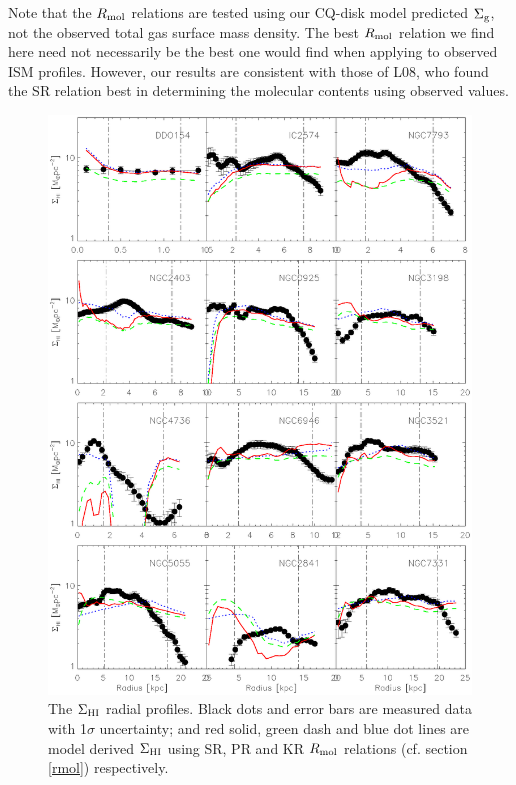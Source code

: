 \documentclass[12pt,preprint]{aastex}
\begin{document}
Note that the $  R_{\rm mol}$ relations are tested using our CQ-disk model predicted $  \Sigma_{\rm g}$, not the observed total gas surface mass density. The best $  R_{\rm mol}$ relation we find here need not necessarily be the best one would find when applying to observed ISM profiles.  However, our results are consistent with those of L08, who found the SR relation best in determining the molecular contents using observed values. 



\begin{figure}
\begin{center}
\includegraphics[scale=0.8]{Sigma_HI.eps}   \caption{The $\Sigma_{\rm HI}$ radial profiles. Black dots and error bars are measured data with 1$\sigma$ uncertainty; and red solid, green dash and blue dot lines are model derived $\Sigma_{\rm HI}$ using SR, PR and KR $R_{\rm mol}$ relations (cf. section \ref{rmol}) respectively. }
\label{Sigma_HI}
\end{center}
\end{figure}
\end{document}
